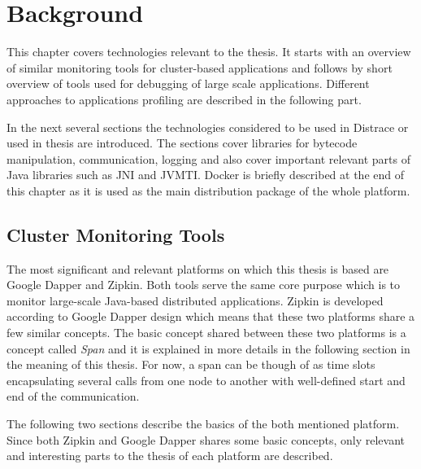 \chapter{Background}
\label{chap:background}
This chapter covers technologies relevant to the thesis. It starts with an overview of similar monitoring tools for cluster-based applications and follows by short overview of tools used for debugging of large scale applications. Different approaches to applications profiling are described in the following part. 

In the next several sections the technologies considered to be used in Distrace or used in thesis are introduced. The sections cover libraries for bytecode manipulation, communication, logging and also cover important relevant parts of Java libraries such as JNI and JVMTI. Docker is briefly described at the end of this chapter as it is used as the main distribution package of the whole platform.

\section{Cluster Monitoring Tools}
The most significant and relevant platforms on which this thesis is based are Google Dapper and Zipkin. Both tools serve the same core purpose which is to monitor large-scale Java-based distributed applications. Zipkin is developed according to Google Dapper design which means that these two platforms share a few similar concepts. The basic concept shared between these two platforms is a concept called \textit{Span} and it is explained in more details in the following section in the meaning of this thesis. For now, a span can be though of as time slots encapsulating several calls from one node to another with well-defined start and end of the communication.

The following two sections describe the basics of the both mentioned platform. Since both Zipkin and Google Dapper shares some basic concepts, only relevant and interesting parts to the thesis of each platform are described.
